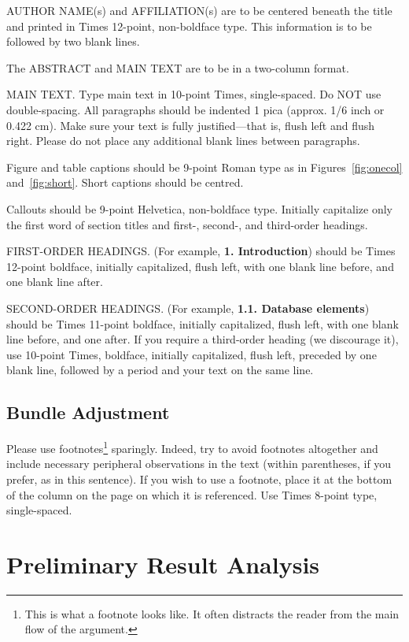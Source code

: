\documentclass[10pt,twocolumn,letterpaper]{article}
\begin{document}
AUTHOR NAME(s) and AFFILIATION(s) are to be centered beneath the title
and printed in Times 12-point, non-boldface type. This information is to
be followed by two blank lines.

The ABSTRACT and MAIN TEXT are to be in a two-column format.

MAIN TEXT. Type main text in 10-point Times, single-spaced. Do NOT use
double-spacing. All paragraphs should be indented 1 pica (approx. 1/6
inch or 0.422 cm). Make sure your text is fully justified---that is,
flush left and flush right. Please do not place any additional blank
lines between paragraphs.

Figure and table captions should be 9-point Roman type as in
Figures~\ref{fig:onecol} and~\ref{fig:short}.  Short captions should be centred.

\noindent Callouts should be 9-point Helvetica, non-boldface type.
Initially capitalize only the first word of section titles and first-,
second-, and third-order headings.

FIRST-ORDER HEADINGS. (For example, {\large \bf 1. Introduction})
should be Times 12-point boldface, initially capitalized, flush left,
with one blank line before, and one blank line after.

SECOND-ORDER HEADINGS. (For example, { \bf 1.1. Database elements})
should be Times 11-point boldface, initially capitalized, flush left,
with one blank line before, and one after. If you require a third-order
heading (we discourage it), use 10-point Times, boldface, initially
capitalized, flush left, preceded by one blank line, followed by a period
and your text on the same line.

\subsection{Bundle Adjustment}

Please use footnotes\footnote {This is what a footnote looks like.  It
often distracts the reader from the main flow of the argument.} sparingly.
Indeed, try to avoid footnotes altogether and include necessary peripheral
observations in
the text (within parentheses, if you prefer, as in this sentence).  If you
wish to use a footnote, place it at the bottom of the column on the page on
which it is referenced. Use Times 8-point type, single-spaced.


\section{Preliminary Result Analysis}
\end{document}
